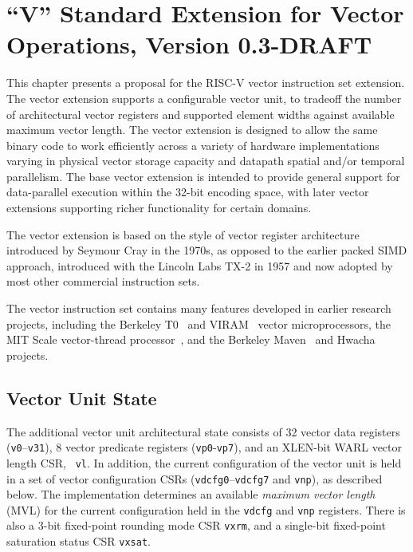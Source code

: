 \chapter{``V'' Standard Extension for Vector Operations, Version 0.3-DRAFT}
\label{sec:bits}

This chapter presents a proposal for the RISC-V vector instruction set
extension.  The vector extension supports a configurable vector unit,
to tradeoff the number of architectural vector registers and supported
element widths against available maximum vector length.  The vector
extension is designed to allow the same binary code to work
efficiently across a variety of hardware implementations varying in
physical vector storage capacity and datapath spatial and/or temporal
parallelism.  The base vector extension is intended to provide general
support for data-parallel execution within the 32-bit encoding space,
with later vector extensions supporting richer functionality for
certain domains.

\begin{commentary}
The vector extension is based on the style of vector register
architecture introduced by Seymour Cray in the 1970s, as opposed to
the earlier packed SIMD approach, introduced with the Lincoln Labs
TX-2 in 1957 and now adopted by most other commercial instruction
sets.

The vector instruction set contains many features developed in earlier
research projects, including the Berkeley T0~\cite{} and VIRAM~\cite{}
vector microprocessors, the MIT Scale vector-thread processor~\cite{},
and the Berkeley Maven~\cite{} and Hwacha~\cite{} projects.
\end{commentary}

\section{Vector Unit State}

The additional vector unit architectural state consists of 32 vector
data registers ({\tt v0}--{\tt v31}), 8 vector predicate registers
({\tt vp0}-{\tt vp7}), and an XLEN-bit WARL vector length CSR, {\tt
  vl}.  In addition, the current configuration of the vector unit is
held in a set of vector configuration CSRs ({\tt vdcfg0}--{\tt vdcfg7}
and {\tt vnp}), as described below.  The implementation determines an
available {\em maximum vector length} (MVL) for the current
configuration held in the {\tt vdcfg} and {\tt vnp} registers.  There
is also a 3-bit fixed-point rounding mode CSR {\tt vxrm}, and a
single-bit fixed-point saturation status CSR {\tt vxsat}.

